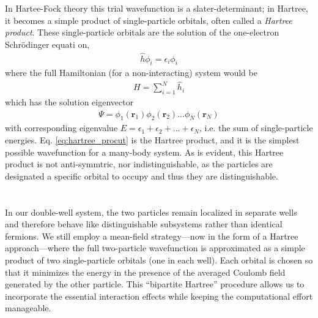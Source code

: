 \documentclass{subfiles}
\begin{document}
In Hartee-Fock theory this trial wavefunction is a slater-determinant; in Hartree, it becomes a simple product of single-particle orbitals, often called a \emph{Hartree product}. These single-particle orbitals are the solution of the one-electron Schrödinger equati on, 
\begin{align*}
    \hat{h}\phi_i = \epsilon_i\phi_i
\end{align*}
where the full Hamiltonian (for a non-interacting) system would be 
\begin{align*}
    H = \sum_{i=1}^N \hat{h}_i
\end{align*}
which has the solution eigenvector
\begin{align}
    \Psi = \phi_1(\mathbf{r}_1)\phi_2(\mathbf{r}_2)...\phi_N(\mathbf{r}_N)\label{eq:hartree_product}
\end{align}
with corresponding eigenvalue $E = \epsilon_1 + \epsilon_2 + ... + \epsilon_N$, i.e. the sum of single-particle energies. Eq. \ref{eq:hartree_procut} is the Hartree product, and it is the simplest possible wavefunction for a many-body system. As is evident, this Hartree product is not anti-symmtric, nor indistinguishable, as the particles are designated a specific orbital to occupy and thus they are distinguishable. \\ \\

\\
In our double-well system, the two particles remain localized in separate wells and therefore behave like distinguishable subsystems rather than identical fermions. We still employ a mean-field strategy—now in the form of a Hartree approach—where the full two-particle wavefunction is approximated as a simple product of two single-particle orbitals (one in each well). Each orbital is chosen so that it minimizes the energy in the presence of the averaged Coulomb field generated by the other particle. This “bipartite Hartree” procedure allows us to incorporate the essential interaction effects while keeping the computational effort manageable.
\end{document}

